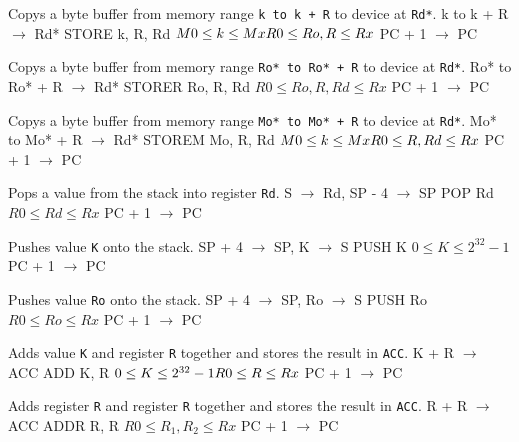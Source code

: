 \documentclass[titlepage]{scrartcl}
\begin{document}
{Copys a byte buffer from memory range \texttt{k to k + R} to device at \texttt{Rd*}.}
{k to k + R $\rightarrow$ Rd*}
{STORE k, R, Rd}
{$M0 \leq k \leq Mx \hfill \break R0 \leq Ro, R \leq Rx$}
{PC + 1 $\rightarrow$ PC}
{}
{\srtable{}{}{}{}}

{Copys a byte buffer from memory range \texttt{Ro* to Ro* + R} to device at \texttt{Rd*}.}
{Ro* to Ro* + R $\rightarrow$ Rd*}
{STORER Ro, R, Rd}
{$R0 \leq Ro, R, Rd \leq Rx$}
{PC + 1 $\rightarrow$ PC}
{}
{\srtable{}{}{}{}}

{Copys a byte buffer from memory range \texttt{Mo* to Mo* + R} to device at \texttt{Rd*}.}
{Mo* to Mo* + R $\rightarrow$ Rd*}
{STOREM Mo, R, Rd}
{$M0 \leq k \leq Mx \hfill \break R0 \leq R, Rd \leq Rx$}
{PC + 1 $\rightarrow$ PC}
{}
{\srtable{}{}{}{}}

{Pops a value from the stack into register \texttt{Rd}.}
{S $\rightarrow$ Rd, SP - 4 $\rightarrow$ SP}
{POP Rd}
{$R0 \leq Rd \leq Rx$}
{PC + 1 $\rightarrow$ PC}
{}
{\srtable{}{}{}{}}

{Pushes value \texttt{K} onto the stack.}
{SP + 4 $\rightarrow$ SP, K $\rightarrow$ S}
{PUSH K}
{$0 \leq K \leq 2^{32} - 1$}
{PC + 1 $\rightarrow$ PC}
{}
{\srtable{}{}{}{}}

{Pushes value \texttt{Ro} onto the stack.}
{SP + 4 $\rightarrow$ SP, Ro $\rightarrow$ S}
{PUSH Ro}
{$R0 \leq Ro \leq Rx$}
{PC + 1 $\rightarrow$ PC}
{}
{\srtable{}{}{}{}}

{Adds value \texttt{K} and register \texttt{R} together and stores the result in \texttt{ACC}.}
{K + R $\rightarrow$ ACC}
{ADD K, R}
{$0 \leq K \leq 2^{32} - 1 \hfill \break R0 \leq R \leq Rx$}
{PC + 1 $\rightarrow$ PC}
{}
{}

{Adds register \texttt{R} and register \texttt{R} together and stores the result in \texttt{ACC}.}
{R + R $\rightarrow$ ACC}
{ADDR R, R}
{$R0 \leq R_{1}, R_{2} \leq Rx$}
{PC + 1 $\rightarrow$ PC}
{}
{}
\end{document}
